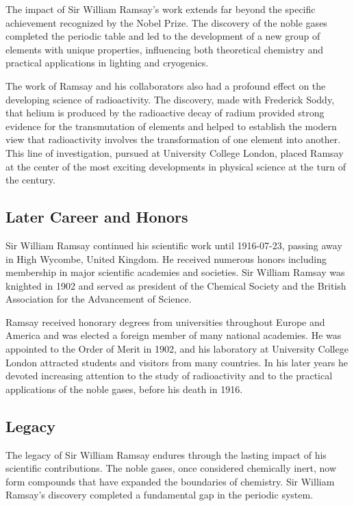 The impact of Sir William Ramsay's work extends far beyond the specific achievement recognized by the Nobel Prize.
The discovery of the noble gases completed the periodic table and led to the development of a new group of elements with unique properties, influencing both theoretical chemistry and practical applications in lighting and cryogenics.

The work of Ramsay and his collaborators also had a profound effect on the developing science of radioactivity. The discovery, made with Frederick Soddy, that helium is produced by the radioactive decay of radium provided strong evidence for the transmutation of elements and helped to establish the modern view that radioactivity involves the transformation of one element into another. This line of investigation, pursued at University College London, placed Ramsay at the center of the most exciting developments in physical science at the turn of the century.

\subsection*{Later Career and Honors}

Sir William Ramsay continued his scientific work until 1916-07-23, passing away in High Wycombe, United Kingdom.
He received numerous honors including membership in major scientific academies and societies.
Sir William Ramsay was knighted in 1902 and served as president of the Chemical Society and the British Association for the Advancement of Science.

Ramsay received honorary degrees from universities throughout Europe and America and was elected a foreign member of many national academies. He was appointed to the Order of Merit in 1902, and his laboratory at University College London attracted students and visitors from many countries. In his later years he devoted increasing attention to the study of radioactivity and to the practical applications of the noble gases, before his death in 1916.

\subsection*{Legacy}

The legacy of Sir William Ramsay endures through the lasting impact of his scientific contributions.
The noble gases, once considered chemically inert, now form compounds that have expanded the boundaries of chemistry. Sir William Ramsay's discovery completed a fundamental gap in the periodic system.

